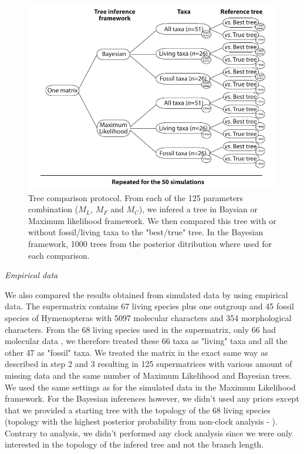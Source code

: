 \documentclass[12pt,letterpaper]{article}
\renewcommand{\subsection}[1]{%
\bigskip
\begin{center}
\begin{large}
\normalfont\itshape #1
\end{large}
\end{center}}
\begin{document}
\begin{figure}
\centering
\includegraphics[keepaspectratio=true]{Figures/TEM_Fig_TreeCmp3.pdf}
\caption{Tree comparison protocol. From each of the 125 parameters combination ($M_L$, $M_F$ and $M_C$), we infered a tree in Baysian or Maximum likelihood framework. We then compared this tree with or without fossil/living taxa to the "best/true" tree. In the Bayesian framework, 1000 trees from the posterior ditribution where used for each comparison.}
\label{Fig_Compare}
\end{figure}

\subsection{Empirical data}
We also compared the results obtained from simulated data by using \citet{ronquista2012} empirical data. The supermatrix contains 67 living species plus one outgroup and 45 fossil species of Hymenopteras with 5097 molecular characters and 354 morphological characters. From the 68 living species used in the supermatrix, only 66 had molecular data %
, we therefore treated these 66 taxa as "living" taxa and all the other 47 as "fossil" taxa. We treated the matrix in the exact same way as described in step 2 and 3 resulting in 125 supermatrices with various amount of missing data and the same number of Maximum Likelihood and Bayesian trees. We used the same settings as for the simulated data in the Maximum Likelihood framework. For the Bayesian inferences however, we didn’t used any priors except that we provided a starting tree with the topology of the 68 living species (topology with the highest posterior probability from non-clock analysis - \citet{ronquista2012}). Contrary to \citet{ronquista2012} analysis, we didn’t performed any clock analysis since we were only interested in the topology of the infered tree and not the branch length.
\end{document}
